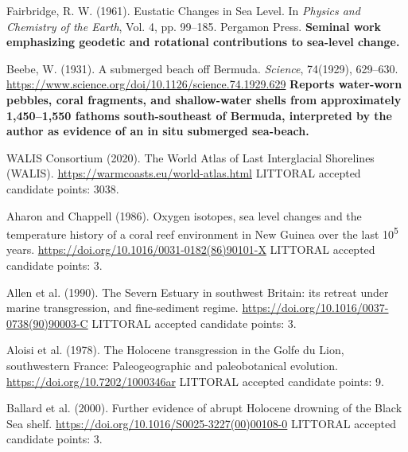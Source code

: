 \documentclass[twocolumn,10pt]{article}
\begin{document}
\begin{thebibliography}{}

Fairbridge, R. W. (1961).
\newblock Eustatic Changes in Sea Level.
\newblock In \emph{Physics and Chemistry of the Earth}, Vol. 4, pp. 99--185.
\newblock Pergamon Press.
\newblock \textbf{Seminal work emphasizing geodetic and rotational contributions to sea-level change.}

Beebe, W. (1931).
\newblock A submerged beach off Bermuda.
\newblock \emph{Science}, 74(1929), 629--630.
\newblock \url{https://www.science.org/doi/10.1126/science.74.1929.629}
\newblock \textbf{Reports water-worn pebbles, coral fragments, and shallow-water shells from approximately 1,450--1,550 fathoms south-southeast of Bermuda, interpreted by the author as evidence of an in situ submerged sea-beach.}

WALIS Consortium (2020).
\newblock The World Atlas of Last Interglacial Shorelines (WALIS).
\newblock \url{https://warmcoasts.eu/world-atlas.html}
\newblock LITTORAL accepted candidate points: 3038.

Aharon and Chappell (1986).
\newblock Oxygen isotopes, sea level changes and the temperature history of a coral reef environment in New Guinea over the last 10\textsuperscript{5} years.
\newblock \url{https://doi.org/10.1016/0031-0182(86)90101-X}
\newblock LITTORAL accepted candidate points: 3.

Allen et al. (1990).
\newblock The Severn Estuary in southwest Britain: its retreat under marine transgression, and fine-sediment regime.
\newblock \url{https://doi.org/10.1016/0037-0738(90)90003-C}
\newblock LITTORAL accepted candidate points: 3.

Aloisi et al. (1978).
\newblock The Holocene transgression in the Golfe du Lion, southwestern France: Paleogeographic and paleobotanical evolution.
\newblock \url{https://doi.org/10.7202/1000346ar}
\newblock LITTORAL accepted candidate points: 9.

Ballard et al. (2000).
\newblock Further evidence of abrupt Holocene drowning of the Black Sea shelf.
\newblock \url{https://doi.org/10.1016/S0025-3227(00)00108-0}
\newblock LITTORAL accepted candidate points: 3.


\end{thebibliography}
\end{document}
